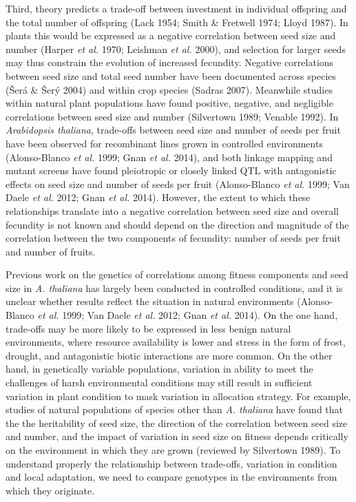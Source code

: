 \documentclass[
]{article}
\begin{document}
Third, theory predicts a trade-off between investment in individual offspring and the total number of offspring (Lack 1954; Smith \& Fretwell 1974; Lloyd 1987). In plants this would be expressed as a negative correlation between seed size and number (Harper \emph{et al.} 1970; Leishman \emph{et al.} 2000), and selection for larger seeds may thus constrain the evolution of increased fecundity. Negative correlations between seed size and total seed number have been documented across species (Šerá \& Šerý 2004) and within crop species (Sadras 2007). Meanwhile studies within natural plant populations have found positive, negative, and negligible correlations between seed size and number (Silvertown 1989; Venable 1992). In \emph{Arabidopsis thaliana}, trade-offs between seed size and number of seeds per fruit have been observed for recombinant lines grown in controlled environments (Alonso-Blanco \emph{et al.} 1999; Gnan \emph{et al.} 2014), and both linkage mapping and mutant screens have found pleiotropic or closely linked QTL with antagonistic effects on seed size and number of seeds per fruit (Alonso-Blanco \emph{et al.} 1999; Van Daele \emph{et al.} 2012; Gnan \emph{et al.} 2014). However, the extent to which these relationships translate into a negative correlation between seed size and overall fecundity is not known and should depend on the direction and magnitude of the correlation between the two components of fecundity: number of seeds per fruit and number of fruits.

Previous work on the genetics of correlations among fitness components and seed size in \emph{A. thaliana} has largely been conducted in controlled conditions, and it is unclear whether results reflect the situation in natural environments (Alonso-Blanco \emph{et al.} 1999; Van Daele \emph{et al.} 2012; Gnan \emph{et al.} 2014). On the one hand, trade-offs may be more likely to be expressed in less benign natural environments, where resource availability is lower and stress in the form of frost, drought, and antagonistic biotic interactions are more common. On the other hand, in genetically variable populations, variation in ability to meet the challenges of harsh environmental conditions may still result in sufficient variation in plant condition to mask variation in allocation strategy. For example, studies of natural populations of species other than \emph{A. thaliana} have found that the the heritability of seed size, the direction of the correlation between seed size and number, and the impact of variation in seed size on fitness depends critically on the environment in which they are grown (reviewed by Silvertown 1989). To understand properly the relationship between trade-offs, variation in condition and local adaptation, we need to compare genotypes in the environments from which they originate.
\end{document}
